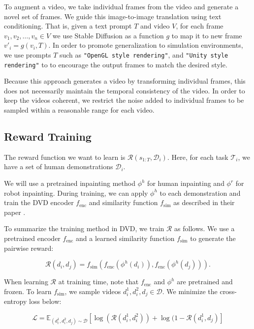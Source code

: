 To augment a video, we take individual frames from the video and generate a novel set of frames. We guide this image-to-image translation using text conditioning. That is, given a text prompt $T$ and video $V$, for each frame $ v_1, v_2, \dots, v_n \in V$ we use Stable Diffusion as a function $g$ to map it to new frame $v'_i = g(v_i, T)$. In order to promote generalization to simulation environments, we use prompts $T$ such as \verb|"OpenGL style rendering"|, and \verb|"Unity style rendering"| to to encourage the output frames to match the desired style.

Because this approach generates a video by transforming individual frames, this does not necessarily maintain the temporal consistency of the video. In order to keep the videos coherent, we restrict the noise added to individual frames to be sampled within a reasonable range for each video.

\subsection{Reward Training}
The reward function we want to learn is $\mathcal{R} (s_{1:T}, \mathcal{D}_i)$. Here, for each task $\mathcal{T}_i$, we have a set of human demonstrations $\mathcal{D}_i$.

We will use a pretrained inpainting method $\phi^h$ for human inpainting and $\phi^r$ for robot inpainting. During training, we can apply $\phi^h$ to each demonstration and train the DVD encoder $f_{\text{enc}}$ and similarity function $f_{\text{sim}}$ as described in their paper \cite{DVD}.

To summarize the training method in DVD, we train $\mathcal{R}$ as follows. We use a pretrained encoder $f_{\text{enc}}$ and a learned similarity function $f_{\text{sim}}$ to generate the pairwise reward:

\vspace{-0.3cm}

$$\mathcal{R}(d_i, d_j) = f_{\text{sim}}(f_{\text{enc}}(\phi^h(d_i)), f_{\text{enc}}(\phi^h(d_j))).$$

When learning $\mathcal{R}$ at training time, note that $f_{\text{enc}}$ and $\phi^h$ are pretrained and frozen. To learn $f_{\text{sim}}$, we sample videos $d_i^1, d_i^2, d_j \in \mathcal{D}$. We minimize the cross-entropy loss below:

\vspace{-0.3cm}

$$\mathcal{L} = \mathbb{E}_{(d_i^1, d_i^2, d_j) \sim \mathcal{D}} [\log (\mathcal{R}(d_i^1, d_i^2)) + \log (1 - \mathcal{R}(d_i^1, d_j)]$$

